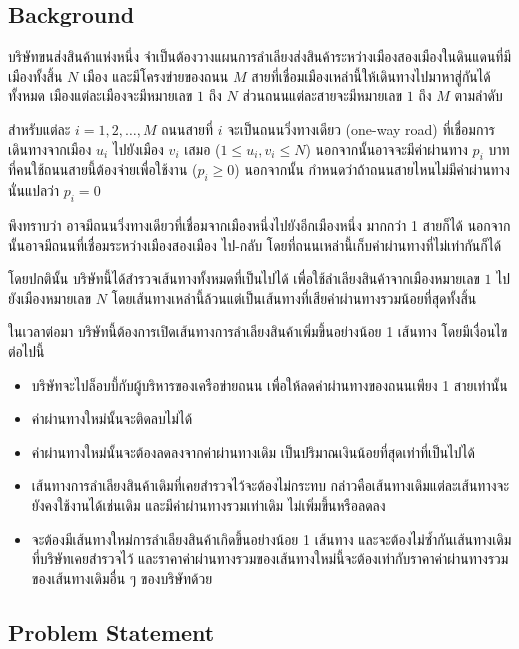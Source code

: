 
\subsection*{\sectionfont\upshape Background}

บริษัทขนส่งสินค้าแห่งหนึ่ง จำเป็นต้องวางแผนการลำเลียงส่งสินค้าระหว่างเมืองสองเมืองในดินแดนที่มีเมืองทั้งสิ้น $N$ เมือง 
และมีโครงข่ายของถนน $M$ สายที่เชื่อมเมืองเหล่านี้ให้เดินทางไปมาหาสู่กันได้ทั้งหมด 
เมืองแต่ละเมืองจะมีหมายเลข $1$ ถึง $N$ ส่วนถนนแต่ละสายจะมีหมายเลข $1$ ถึง $M$ ตามลำดับ

สำหรับแต่ละ $i=1,2,\ldots,M$ ถนนสายที่ $i$ จะเป็นถนนวิ่งทางเดียว (one-way road) 
ที่เชื่อมการเดินทางจากเมือง $u_i$ ไปยังเมือง $v_i$ เสมอ ($1 \leq u_i, v_i \leq N$) 
นอกจากนั้นอาจจะมีค่าผ่านทาง $p_i$ บาทที่คนใช้ถนนสายนี้ต้องจ่ายเพื่อใช้งาน ($p_i \geq 0$) 
นอกจากนั้น กำหนดว่าถ้าถนนสายไหนไม่มีค่าผ่านทาง นั่นแปลว่า $p_i = 0$

พึงทราบว่า อาจมีถนนวิ่งทางเดียวที่เชื่อมจากเมืองหนึ่งไปยังอีกเมืองหนึ่ง มากกว่า 1 สายก็ได้ 
นอกจากนั้นอาจมีถนนที่เชื่อมระหว่างเมืองสองเมือง ไป-กลับ โดยที่ถนนเหล่านี้เก็บค่าผ่านทางที่ไม่เท่ากันก็ได้

โดยปกตินั้น บริษัทนี้ได้สำรวจเส้นทางทั้งหมดที่เป็นไปได้ เพื่อใช้ลำเลียงสินค้าจากเมืองหมายเลข $1$ ไปยังเมืองหมายเลข $N$ 
โดยเส้นทางเหล่านี้ล้วนแต่เป็นเส้นทางที่เสียค่าผ่านทางรวมน้อยที่สุดทั้งสิ้น

ในเวลาต่อมา บริษัทนี้ต้องการเปิดเส้นทางการลำเลียงสินค้าเพิ่มขึ้นอย่างน้อย 1 เส้นทาง โดยมีเงื่อนไขต่อไปนี้
\begin{itemize}
\item บริษัทจะไปล็อบบี้กับผู้บริหารของเครือข่ายถนน เพื่อให้ลดค่าผ่านทางของถนนเพียง 1 สายเท่านั้น
\item ค่าผ่านทางใหม่นั้นจะติดลบไม่ได้
\item ค่าผ่านทางใหม่นั้นจะต้องลดลงจากค่าผ่านทางเดิม เป็นปริมาณเงินน้อยที่สุดเท่าที่เป็นไปได้
\item เส้นทางการลำเลียงสินค้าเดิมที่เคยสำรวจไว้จะต้องไม่กระทบ กล่าวคือเส้นทางเดิมแต่ละเส้นทางจะยังคงใช้งานได้เช่นเดิม และมีค่าผ่านทางรวมเท่าเดิม ไม่เพิ่มขึ้นหรือลดลง
\item จะต้องมีเส้นทางใหม่การลำเลียงสินค้าเกิดขึ้นอย่างน้อย 1 เส้นทาง และจะต้องไม่ซ้ำกันเส้นทางเดิมที่บริษัทเคยสำรวจไว้ และราคาค่าผ่านทางรวมของเส้นทางใหม่นี้จะต้องเท่ากับราคาค่าผ่านทางรวมของเส้นทางเดิมอื่น ๆ ของบริษัทด้วย
\end{itemize}

\subsection*{\sectionfont\upshape Problem Statement}

